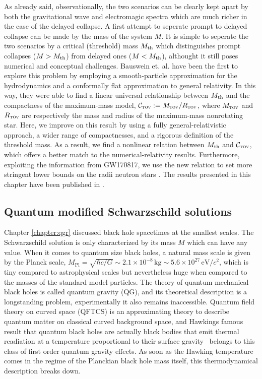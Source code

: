 \begin{fullwidth}
As already said, observationally, the two scenarios can be clearly kept apart
by both the gravitational wave and electromagic spectra which are much
richer in the case of the delayed collapse. A first attempt to seperate
prompt to delayed collapse can be made by the mass of the system $M$.
It is simple to seperate the two scenarios by a critical 
(threshold) mass $M_\textrm{th}$ which distinguishes prompt collapses ($M>M_\textrm{th}$) from
delayed ones ($M<M_\textrm{th}$), althought it still poses numerical and conceptual
challenges. Bauswein et. al. \cite{Bauswein2013} have been the 
first to explore this problem by employing a smooth-particle approximation for
the hydrodynamics and a conformally flat approximation to general
relativity. In this way, they were able to find a linear universal
relationship between $M_{\rm th}$ and the compactness of the maximum-mass
model, $\mathcal{C}_{\textsc{tov}}:=M_{\textsc{tov}}/R_{\textsc{tov}}$, where
$M_{\textsc{tov}}$ and $R_{\textsc{tov}}$ are respectively the mass and
radius of the maximum-mass nonrotating star. Here, we improve on this
result by using a fully general-relativistic approach, a wider range of
compactnesses, and a rigorous definition of the threshold mass. As a
result, we find a {nonlinear} relation between $M_{\rm th}$ and
$\mathcal{C}_{\textsc{tov}}$, which offers a better match to the
numerical-relativity results. Furthermore, exploiting the information
from GW170817, we use the new relation to set more stringent lower bounds
on the radii neutron stars \cite{Bauswein2013,Bozzola2017,Bauswein2017b}.
%
The results presented in this chapter have been published in
\cite{Koeppel2019}.

\subsection{Quantum modified Schwarzschild solutions}\label{sec:qbh-intro}
Chapter \vref{chapter:qgr} discussed black hole spacetimes at the smallest scales. 
The Schwarzschild solution is only characterized by its mass $M$ which can have
any value. When it comes to quantum size black holes, a natural
mass scale is given by the Planck scale,
$
M_\text{Pl} = \sqrt{{\hbar c}/{G}} \sim 2.1 \times 10^{-8}\, \text{kg} \sim 5.6 \times 10^{27}
\,\text{eV}/c^2
$,
which is tiny compared to astrophysical scales but nevertheless huge when compared
to the masses of the standard model particles. The theory of quantum mechanical black holes
is called quantum gravity (QG), and its theoretical description is a longstanding
problem, experimentally it also remains inaccessible. Quantum field theory on curved
space (QFTCS) is an approximating theory to describe quantum matter on classical curved
background space, and Hawkings famous result that quantum black holes are actually
black bodies that emit thermal readiation at a temperature proportional to their
surface gravity~\cite{Haw75} belongs to this class of first order quantum gravity effects.
As soon as the Hawking temperature comes in the regime of the Planckian black hole mass
itself, this thermodynamical description breaks down.


\end{fullwidth}
